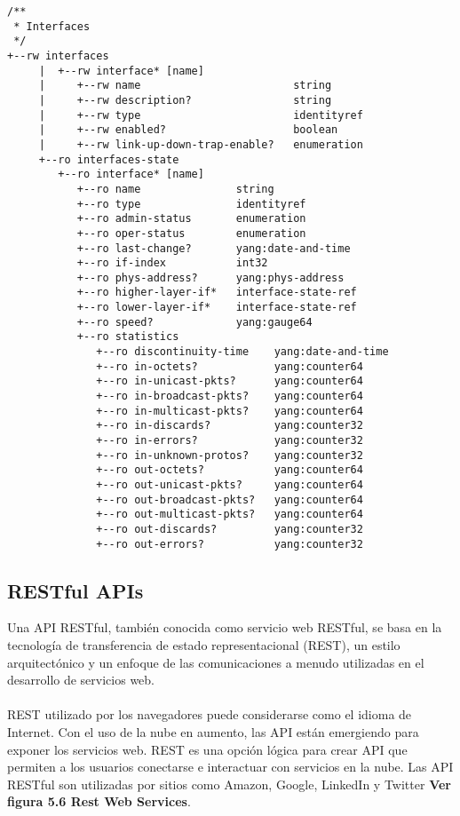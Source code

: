 \lstset{language=java, caption=Interface YANG, label=lst:Interface}
\begin{lstlisting}
/** 
 * Interfaces
 */
+--rw interfaces
     |  +--rw interface* [name]
     |     +--rw name                        string
     |     +--rw description?                string
     |     +--rw type                        identityref
     |     +--rw enabled?                    boolean
     |     +--rw link-up-down-trap-enable?   enumeration
     +--ro interfaces-state
        +--ro interface* [name]
           +--ro name               string
           +--ro type               identityref
           +--ro admin-status       enumeration
           +--ro oper-status        enumeration
           +--ro last-change?       yang:date-and-time
           +--ro if-index           int32
           +--ro phys-address?      yang:phys-address
           +--ro higher-layer-if*   interface-state-ref
           +--ro lower-layer-if*    interface-state-ref
           +--ro speed?             yang:gauge64
           +--ro statistics
              +--ro discontinuity-time    yang:date-and-time
              +--ro in-octets?            yang:counter64
              +--ro in-unicast-pkts?      yang:counter64
              +--ro in-broadcast-pkts?    yang:counter64
              +--ro in-multicast-pkts?    yang:counter64
              +--ro in-discards?          yang:counter32
              +--ro in-errors?            yang:counter32
              +--ro in-unknown-protos?    yang:counter32
              +--ro out-octets?           yang:counter64
              +--ro out-unicast-pkts?     yang:counter64
              +--ro out-broadcast-pkts?   yang:counter64
              +--ro out-multicast-pkts?   yang:counter64
              +--ro out-discards?         yang:counter32
              +--ro out-errors?           yang:counter32
\end{lstlisting}


\subsection{RESTful APIs}
\label{sec:RESTful APIs}

Una API RESTful, también conocida como servicio web RESTful, se basa en la tecnología de transferencia de estado representacional (REST), un estilo arquitectónico y un enfoque de las comunicaciones a menudo utilizadas en el desarrollo de servicios web.\\
\\
REST utilizado por los navegadores puede considerarse como el idioma de Internet. Con el uso de la nube en aumento, las API están emergiendo para exponer los servicios web. REST es una opción lógica para crear API que permiten a los usuarios conectarse e interactuar con servicios en la nube. Las API RESTful son utilizadas por sitios como Amazon, Google, LinkedIn y Twitter \textbf{Ver figura 5.6 Rest Web Services}.

